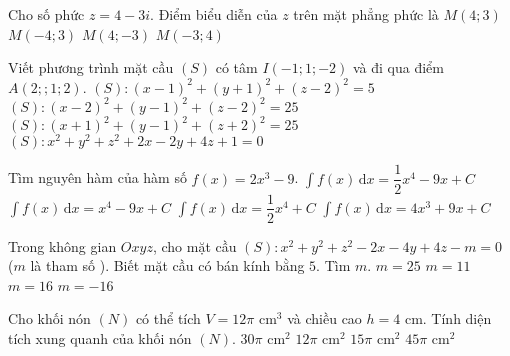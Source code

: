 \begin{ex}%
	Cho số phức $z=4-3i$. Điểm biểu diễn của $z$ trên mặt phẳng phức là
	\choice%
	{$M(4;3)$}
	{$M(-4;3)$}
	{\True $M(4;-3)$}
	{$M(-3;4)$}
\end{ex}


\begin{ex}%
	Viết phương trình mặt cầu $(S)$ có tâm $I(-1;1;-2)$ và đi qua điểm $A(2;;1;2)$.
	\choice%
	{$(S)\colon (x-1)^2 +(y+1)^2 +(z-2)^2=5$}
	{$(S)\colon (x-2)^2 +(y-1)^2 +(z-2)^2=25$}
	{\True $(S)\colon (x+1)^2 +(y-1)^2 +(z+2)^2=25$}
	{$(S)\colon x^2 +y^2 +z^2 +2x -2y +4z + 1 = 0$}
\end{ex}

\begin{ex}%
	Tìm nguyên hàm của hàm số $f(x)=2x^3-9$.
	\choice%
	{\True $\displaystyle \int f(x)\mathrm{\,d}x=\dfrac{1}{2}x^4-9x+C$}
	{$\displaystyle \int f(x)\mathrm{\,d}x=x^4-9x+C$}
	{$\displaystyle \int f(x)\mathrm{\,d}x=\dfrac{1}{2}x^4+C$}
	{$\displaystyle \int f(x)\mathrm{\,d}x=4x^3+9x+C$}
\end{ex}

\begin{ex}%
	Trong không gian $Oxyz$, cho mặt cầu $(S)\colon x^2 + y^2+ z^2 -2x - 4y + 4z - m = 0$ ($m$ là tham số ). Biết mặt cầu có  bán kính bằng $5$. Tìm $m$.
	\choice%
	{$m=25$}
	{$m=11$}
	{\True $m=16$}
	{$m=-16$}
\end{ex}


\begin{ex}%
	Cho khối nón $(N)$ có thể tích $V=12\pi$ cm$^3$ và chiều cao $h=4$ cm. Tính diện tích xung quanh của khối nón $(N)$.
	\choice%
	{$30\pi$ cm$^2$}
	{$12\pi$ cm$^2$}
	{\True $15\pi$ cm$^2$}
	{$45\pi$ cm$^2$}
\end{ex}

